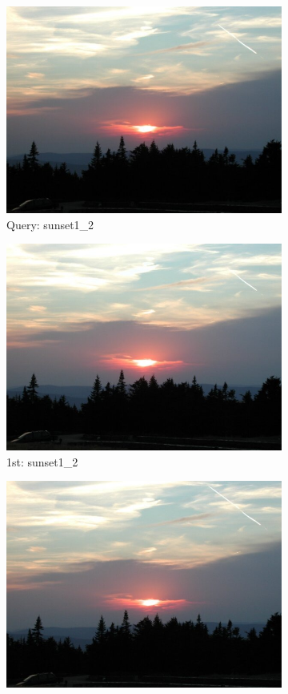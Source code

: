 \begin{itemize}
\begin{figure}[H]
	\centering
	\begin{subfigure}{0.25\textwidth}
	  \centering
	  \includegraphics[width=0.9\linewidth]{../input/sunset1_2.jpg}
	  \caption{Query: sunset1\_2}
	\end{subfigure}%
	\begin{subfigure}{0.25\textwidth}
	  \centering
	  \includegraphics[width=0.9\linewidth]{../input/sunset1_1.jpg}
	  \caption{1st: sunset1\_2}
	\end{subfigure}%
	\begin{subfigure}{0.25\textwidth}
        \centering
        \includegraphics[width=0.9\linewidth]{../input/sunset1_3.jpg}

\end{subfigure}
\end{figure}
\end{itemize}
